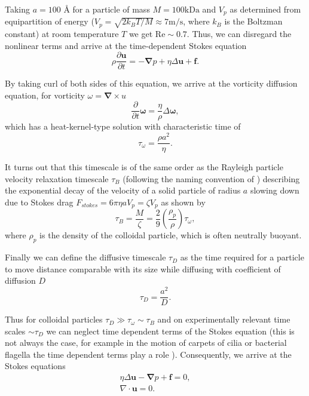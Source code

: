 \documentclass{doctoral}
\newcommand{\pd}{\partial}
\newcommand{\Reynolds}{\mathrm{Re}}
\begin{document}
Taking $a = 100$ \AA{} for a particle of mass $M = 100 \mathrm{k Da}$ and $V_p$ as determined from equipartition of energy ($V_p = \sqrt{2 k_{B} T / M} \approx 7 \mathrm{m/s}$, where $k_B$ is the Boltzman constant) at room temperature $T$ we get $\Reynolds \sim 0.7$.
Thus, we can disregard the nonlinear terms and arrive at the time-dependent Stokes equation
\begin{equation}
    \rho \frac{\pd \bm{u}}{\pd t} = - \bm{\nabla} p + \eta \Delta \bm{u} + \bm{f}.
    \label{eqn:time-dependent-stokes-equation}
\end{equation}

By taking curl of both sides of this equation, we arrive at the vorticity diffusion equation, for vorticity $\omega = \bm{\nabla} \times u$
\begin{equation}
    \frac{\pd}{\pd t} \bm{\omega}  = \frac{\eta}{\rho} \Delta \bm{\omega} , \label{eqn:vorticity-diffusion}
\end{equation}
which has a heat-kernel-type solution with characteristic time of
\begin{equation}
    \tau_\omega = \frac{\rho a^2}{\eta}.
    \label{eqn:vorticity-timescale}
\end{equation}

It turns out that this timescale is of the same order as the Rayleigh particle velocity relaxation timescale $\tau_B$ (following the naming convention of \textcite{vanKampen_2011}) describing the exponential decay of the velocity of a solid particle of radius $a$ slowing down due to Stokes drag $F_{stokes} = 6 \pi \eta a V_p = \zeta V_p$ as shown by
\begin{equation}
    \tau_B = \frac{M}{\zeta} = \frac{2}{9} \left( \frac{\rho_p}{\rho} \right) \tau_\omega, \label{eqn:raighley-timescale}
\end{equation}
where $\rho_p$ is the density of the colloidal particle, which is often neutrally buoyant.

Finally we can define the diffusive timescale $\tau_D$ as the time required for a particle to move distance comparable with its size while diffusing with coefficient of diffusion $D$
\begin{equation}
    \tau_D = \frac{a^2}{D}.
    \label{eqn:diffusive-timescale}
\end{equation}

Thus for colloidal particles $\tau_D \gg \tau_\omega \sim \tau_B$ and on experimentally relevant time scales $\sim \tau_D$ we can neglect time dependent terms of the Stokes equation (this is not always the case, for example in the motion of carpets of cilia or bacterial flagella the time dependent terms play a role \cite{Wei_2021}).
Consequently, we arrive at the Stokes equations
\begin{eqnarray}
    \eta \Delta \bm{u} - \bm{\nabla} p + \bm{f} = 0, \label{eqn:stokes-equation} \\
    \nabla \cdot \bm{u} = 0.
\end{eqnarray}
\end{document}
